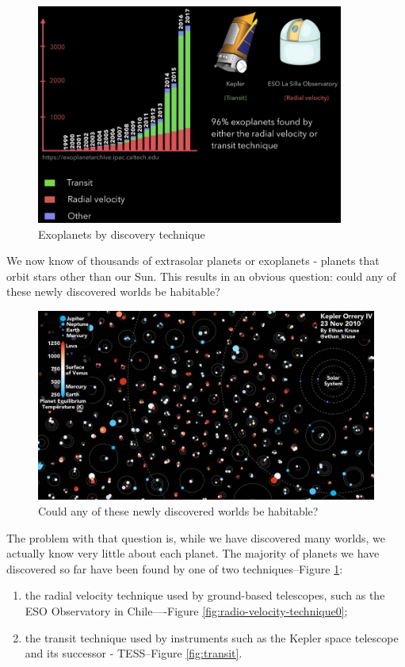 \documentclass[]{article}
\begin{document}
\begin{figure}[H]
	\caption{Exoplanets by discovery technique}\label{fig:exoplants}
	\includegraphics[width=0.9\textwidth]{Exoplanets}
\end{figure}

We now know of thousands of
extrasolar planets or exoplanets -
planets that orbit stars
other than our Sun.
This results in an obvious question:
could any of these newly discovered
worlds be habitable?

\begin{figure}[H]
	\caption{Could any of these newly discovered
		worlds be habitable?}\label{fig:could-any-be-habitable}
	\includegraphics[width=\textwidth]{could-any-be-habitable}
\end{figure}
The problem with that question is,
while we have discovered many worlds,
we actually know very little
about each planet.
The majority of planets
we have discovered so far
have been found by one
of two techniques--Figure \ref{fig:exoplants}:
\begin{enumerate}
	\item the radial velocity technique used by ground-based telescopes, such as the ESO Observatory in Chile----Figure \ref{fig:radio-velocity-technique0};
	\item the transit technique used by instruments such as the Kepler space telescope and its successor - TESS--Figure \ref{fig:transit}.
\end{enumerate}
\end{document}
